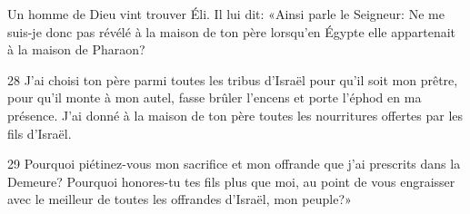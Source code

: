 Un homme de Dieu vint trouver Éli. Il lui dit: «Ainsi parle le Seigneur: Ne me suis-je donc pas révélé à la maison de ton père lorsqu’en Égypte elle appartenait à la maison de Pharaon?

28 J’ai choisi ton père parmi toutes les tribus d’Israël pour qu’il soit mon prêtre, pour qu’il monte à mon autel, fasse brûler l’encens et porte l’éphod en ma présence. J’ai donné à la maison de ton père toutes les nourritures offertes par les fils d’Israël.

29 Pourquoi piétinez-vous mon sacrifice et mon offrande que j’ai prescrits dans la Demeure? Pourquoi honores-tu tes fils plus que moi, au point de vous engraisser avec le meilleur de toutes les offrandes d’Israël, mon peuple?»
